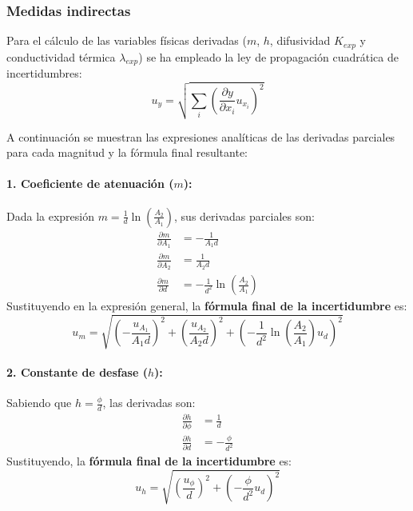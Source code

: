 \documentclass[a4paper,11pt]{article}
\begin{document}
\subsubsection*{Medidas indirectas}
Para el cálculo de las variables físicas derivadas ($m$, $h$, difusividad $K_{exp}$ y conductividad térmica $\lambda_{exp}$) se ha empleado la ley de propagación cuadrática de incertidumbres:
\begin{equation}
    u_y = \sqrt{\sum_{i} \left( \frac{\partial y}{\partial x_i} u_{x_i} \right)^2}
\end{equation}

A continuación se muestran las expresiones analíticas de las derivadas parciales para cada magnitud y la fórmula final resultante:

\paragraph{1. Coeficiente de atenuación ($m$):}
Dada la expresión $m = \frac{1}{d} \ln\left(\frac{A_2}{A_1}\right)$, sus derivadas parciales son:
\begin{align}
    \frac{\partial m}{\partial A_1} &= -\frac{1}{A_1 d} \\
    \frac{\partial m}{\partial A_2} &= \frac{1}{A_2 d} \\
    \frac{\partial m}{\partial d} &= -\frac{1}{d^2} \ln\left(\frac{A_2}{A_1}\right)
\end{align}
Sustituyendo en la expresión general, la \textbf{fórmula final de la incertidumbre} es:
\begin{equation}
    u_m = \sqrt{ \left( -\frac{u_{A_1}}{A_1 d} \right)^2 + \left( \frac{u_{A_2}}{A_2 d} \right)^2 + \left( -\frac{1}{d^2} \ln\left(\frac{A_2}{A_1}\right) u_d \right)^2 }
\end{equation}

\paragraph{2. Constante de desfase ($h$):}
Sabiendo que $h = \frac{\phi}{d}$, las derivadas son:
\begin{align}
    \frac{\partial h}{\partial \phi} &= \frac{1}{d} \\
    \frac{\partial h}{\partial d} &= -\frac{\phi}{d^2}
\end{align}
Sustituyendo, la \textbf{fórmula final de la incertidumbre} es:
\begin{equation}
    u_h = \sqrt{ \left( \frac{u_{\phi}}{d} \right)^2 + \left( -\frac{\phi}{d^2} u_d \right)^2 }
\end{equation}
\end{document}
